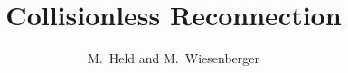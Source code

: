 



\renewcommand{\ne}{\ensuremath{n }}
\newcommand{\Ni}{\ensuremath{N}}
\newcommand{\ue}{\ensuremath{u_\parallel}}
\newcommand{\Ui}{\ensuremath{U_\parallel}}
\newcommand{\Apar}{\ensuremath{A_\parallel}}
\newcommand{\neref}{\ensuremath{n_0}}
\newcommand{\Teref}{\ensuremath{T_{e0}}} %



\title{Collisionless Reconnection}
\author{ M.~Held and M.~Wiesenberger}
\maketitle

\begin{abstract}
\end{abstract}

